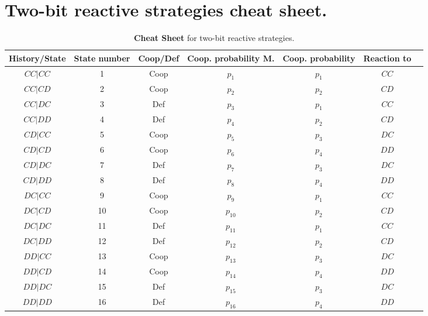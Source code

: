 \documentclass{article}
\theoremstyle{definition}
\begin{document}
\appendix

\section{Two-bit reactive strategies cheat sheet.}

\begin{table}[h!]
  \centering
   \begin{tabular}{c c c c c c c }
  \toprule
   History/State & State number & Coop/Def & Coop. probability M. & Coop. probability & Reaction to & \\
   \toprule
  $CC|CC$  & 1 & Coop  & $p_1$ & $p_1$ & $CC$\\
  $CC|CD$  & 2 & Coop  & $p_2$ & $p_2$ & $CD$ \\
  $CC|DC$  & 3 & Def   & $p_3$ & $p_1$ & $CC$ \\
  $CC|DD$  & 4 & Def   & $p_4$ & $p_2$ & $CD$ \\
  $CD|CC$  & 5 & Coop  & $p_5$ & $p_3$ & $DC$ \\
  $CD|CD$  & 6 & Coop  & $p_6$ & $p_4$ & $DD$ \\
  $CD|DC$  & 7 & Def   & $p_7$ & $p_3$ & $DC$ \\
  $CD|DD$  & 8 & Def   & $p_8$ & $p_4$ & $DD$ \\
  $DC|CC$  & 9 & Coop  & $p_9$ & $p_1$ & $CC$ \\
  $DC|CD$  & 10 & Coop & $p_{10}$ & $p_2$ & $CD$ \\
  $DC|DC$  & 11 & Def  & $p_{11}$ & $p_1$ & $CC$ \\
  $DC|DD$  & 12 & Def  & $p_{12}$ & $p_2$ & $CD$ \\
  $DD|CC$  & 13 & Coop & $p_{13}$ & $p_3$ & $DC$ \\
  $DD|CD$  & 14 & Coop & $p_{14}$ & $p_4$ & $DD$ \\
  $DD|DC$  & 15 & Def  & $p_{15}$ & $p_3$ & $DC$ \\
  $DD|DD$  & 16 & Def  & $p_{16}$ & $p_4$ & $DD$ \\
  \hline
\end{tabular}
\caption{\textbf{Cheat Sheet} for two-bit reactive strategies.}
\end{table}



\end{document}
